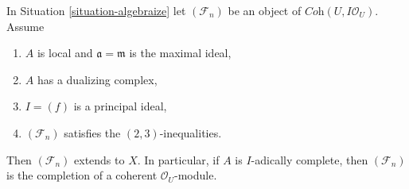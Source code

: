 %
\begin{lemma}
\label{lemma-algebraization-principal-bis}
In Situation \ref{situation-algebraize} let $(\mathcal{F}_n)$ be an object
of $\textit{Coh}(U, I\mathcal{O}_U)$. Assume
\begin{enumerate}
\item $A$ is local and $\mathfrak a = \mathfrak m$ is the maximal ideal,
\item $A$ has a dualizing complex,
\item $I = (f)$ is a principal ideal,
\item $(\mathcal{F}_n)$ satisfies the $(2, 3)$-inequalities.
\end{enumerate}
Then $(\mathcal{F}_n)$ extends to $X$. In particular, if $A$ is
$I$-adically complete, then $(\mathcal{F}_n)$ is the completion
of a coherent $\mathcal{O}_U$-module. 
\end{lemma}


